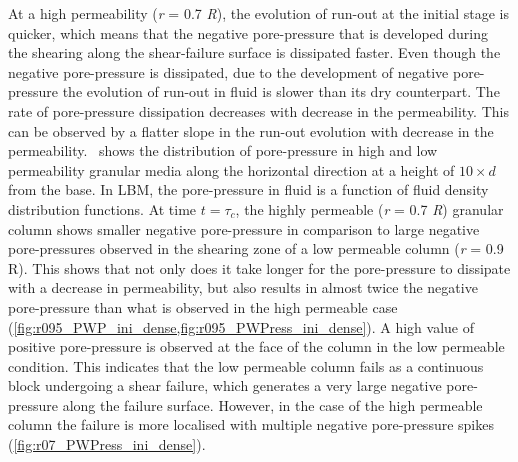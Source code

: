 At a high permeability (\textit{r} = 0.7 \textit{R}), the evolution of run-out 
at the initial stage is quicker, which means that the negative pore-pressure 
that is developed during the shearing along the shear-failure surface is 
dissipated faster. Even though the negative pore-pressure is dissipated, due to 
the development of negative pore-pressure the evolution of run-out in fluid is 
slower than its dry counterpart. The rate of pore-pressure dissipation 
decreases with decrease in the permeability. This can be observed by a flatter 
slope in the run-out evolution with decrease in the 
permeability.~ shows the distribution of pore-pressure 
in high and low permeability granular media along the horizontal direction at a 
height of $10 \times d$ from the base. In LBM, the pore-pressure in fluid is a 
function of fluid density distribution functions. At time $t = \tau_c$, the 
highly permeable (\textit{r} = 0.7 \textit{R}) granular column 
shows smaller negative pore-pressure in comparison to large negative 
pore-pressures observed in the shearing zone of a low permeable column 
(\textit{r} = 0.9 R). This shows that not only does it take longer for the 
pore-pressure to dissipate with a decrease in permeability, but also results in 
almost twice the negative pore-pressure than what is observed in the high 
permeable case (\cref{fig:r095_PWP_ini_dense,fig:r095_PWPress_ini_dense}). A 
high value of positive pore-pressure is observed at the face of the column 
in the low permeable condition. This indicates that the low permeable column 
fails as a continuous block undergoing a shear failure, which generates a very 
large negative pore-pressure along the failure surface. However, in the case of 
the high permeable column the failure is more localised with multiple negative 
pore-pressure spikes (\cref{fig:r07_PWPress_ini_dense}).

